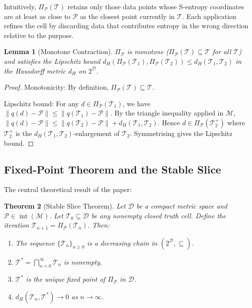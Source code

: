 \documentclass[10pt,twocolumn]{article}
\newtheorem{theorem}{Theorem}[section]
\newtheorem{lemma}[theorem]{Lemma}
\DeclareMathOperator{\interior}{int}
\newcommand{\ProbeOp}{\Pi_\mathcal{P}}
\newcommand{\TruthCell}{\mathcal{T}}
\newcommand{\PurposePoint}{\mathcal{P}}
\newcommand{\DataSpace}{\mathcal{D}}
\newcommand{\ManifoldM}{\mathcal{M}}
\begin{document}
Intuitively, $\ProbeOp(\TruthCell)$ retains only those data points whose
S-entropy coordinates are at least as close to $\PurposePoint$ as the
closest point currently in $\TruthCell$.
Each application refines the cell by discarding data that contributes
entropy in the wrong direction relative to the purpose.

\begin{lemma}[Monotone Contraction]
\label{lem:monotone}
$\ProbeOp$ is monotone ($\ProbeOp(\TruthCell) \subseteq \TruthCell$ for all $\TruthCell$)
and satisfies the Lipschitz bound
$d_H(\ProbeOp(\TruthCell_1), \ProbeOp(\TruthCell_2)) \leq d_H(\TruthCell_1, \TruthCell_2)$
in the Hausdorff metric $d_H$ on $2^\DataSpace$.
\end{lemma}

\begin{proof}
Monotonicity: By definition, $\ProbeOp(\TruthCell) \subseteq \TruthCell$.

Lipschitz bound: For any $d \in \ProbeOp(\TruthCell_1)$,
we have $\|q(d) - \PurposePoint\| \leq \|q(\TruthCell_1) - \PurposePoint\|$.
By the triangle inequality applied in $\ManifoldM$,
$\|q(d) - \PurposePoint\| \leq \|q(\TruthCell_2) - \PurposePoint\| + d_H(\TruthCell_1, \TruthCell_2)$.
Hence $d \in \ProbeOp(\TruthCell_2^+)$ where $\TruthCell_2^+$ is the
$d_H(\TruthCell_1, \TruthCell_2)$-enlargement of $\TruthCell_2$.
Symmetrising gives the Lipschitz bound.
\end{proof}

\subsection{Fixed-Point Theorem and the Stable Slice}

The central theoretical result of the paper:

\begin{theorem}[Stable Slice Theorem]
\label{thm:fixed-point}
Let $\DataSpace$ be a compact metric space and $\PurposePoint \in \interior(\ManifoldM)$.
Let $\TruthCell_0 \subseteq \DataSpace$ be any nonempty closed truth cell.
Define the iteration $\TruthCell_{n+1} = \ProbeOp(\TruthCell_n)$.
Then:
\begin{enumerate}[label=(\alph*)]
\item The sequence $\{\TruthCell_n\}_{n \geq 0}$ is a decreasing chain in $(2^\DataSpace, \subseteq)$.
\item $\TruthCell^* = \bigcap_{n=0}^\infty \TruthCell_n$ is nonempty.
\item $\TruthCell^*$ is the unique fixed point of $\ProbeOp$ in $\DataSpace$.
\item $d_H(\TruthCell_n, \TruthCell^*) \to 0$ as $n \to \infty$.
\end{enumerate}
\end{theorem}
\end{document}
